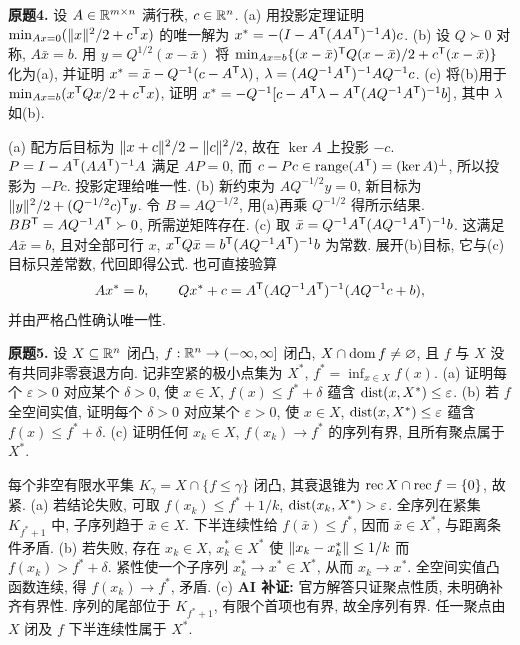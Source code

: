 \begin{exercise}\label{ass:6253-hw2-q4}
\textbf{原题4.} 设 $A\in\mathbb R^{m\times n}$ 满行秩, $c\in\mathbb R^n$.
(a) 用投影定理证明 $\min_{Ax=0}(\lVert x\rVert^2/2+c^{\mathsf T} x)$ 的唯一解为
$x^*=-(I-A^{\mathsf T}(AA^{\mathsf T})^{-1}A)c$.
(b) 设 $Q\succ0$ 对称, $A\bar x=b$. 用 $y=Q^{1/2}(x-\bar x)$ 将
$\min_{Ax=b}\{(x-\bar x)^{\mathsf T} Q(x-\bar x)/2+c^{\mathsf T}(x-\bar x)\}$ 化为(a), 并证明
$x^*=\bar x-Q^{-1}(c-A^{\mathsf T}\lambda)$, $\lambda=(AQ^{-1}A^{\mathsf T})^{-1}AQ^{-1}c$.
(c) 将(b)用于 $\min_{Ax=b}(x^{\mathsf T} Qx/2+c^{\mathsf T} x)$, 证明
$x^*=-Q^{-1}[c-A^{\mathsf T}\lambda-A^{\mathsf T}(AQ^{-1}A^{\mathsf T})^{-1}b]$, 其中 $\lambda$ 如(b).
\end{exercise}
\begin{solution}
(a) 配方后目标为 $\lVert x+c\rVert^2/2-\lVert c\rVert^2/2$, 故在 $\ker A$ 上投影 $-c$. $P=I-A^{\mathsf T}(AA^{\mathsf T})^{-1}A$ 满足 $AP=0$, 而 $c-Pc\in\operatorname{range}(A^{\mathsf T})=(\ker A)^\perp$, 所以投影为 $-Pc$. 投影定理给唯一性.
(b) 新约束为 $AQ^{-1/2}y=0$, 新目标为 $\lVert y\rVert^2/2+(Q^{-1/2}c)^{\mathsf T} y$. 令 $B=AQ^{-1/2}$, 用(a)再乘 $Q^{-1/2}$ 得所示结果. $BB^{\mathsf T}=AQ^{-1}A^{\mathsf T}\succ0$, 所需逆矩阵存在.
(c) 取 $\bar x=Q^{-1}A^{\mathsf T}(AQ^{-1}A^{\mathsf T})^{-1}b$. 这满足 $A\bar x=b$, 且对全部可行 $x$, $x^{\mathsf T} Q\bar x=b^{\mathsf T}(AQ^{-1}A^{\mathsf T})^{-1}b$ 为常数. 展开(b)目标, 它与(c)目标只差常数, 代回即得公式. 也可直接验算
\[
Ax^*=b,\qquad Qx^*+c=A^{\mathsf T}(AQ^{-1}A^{\mathsf T})^{-1}(AQ^{-1}c+b),
\]
并由严格凸性确认唯一性.
\end{solution}

\begin{exercise}\label{ass:6253-hw2-q5}
\textbf{原题5.} 设 $X\subseteq\mathbb R^n$ 闭凸, $f:\mathbb R^n\to(-\infty,\infty]$ 闭凸, $X\cap\operatorname{dom} f\ne\varnothing$, 且 $f$ 与 $X$ 没有共同非零衰退方向. 记非空紧的极小点集为 $X^*$, $f^*=\inf_{x\in X}f(x)$.
(a) 证明每个 $\varepsilon>0$ 对应某个 $\delta>0$, 使 $x\in X$, $f(x)\le f^*+\delta$ 蕴含 $\operatorname{dist}(x,X^*)\le\varepsilon$.
(b) 若 $f$ 全空间实值, 证明每个 $\delta>0$ 对应某个 $\varepsilon>0$, 使 $x\in X$, $\operatorname{dist}(x,X^*)\le\varepsilon$ 蕴含 $f(x)\le f^*+\delta$.
(c) 证明任何 $x_k\in X$, $f(x_k)\to f^*$ 的序列有界, 且所有聚点属于 $X^*$.
\end{exercise}
\begin{solution}
每个非空有限水平集 $K_\gamma=X\cap\{f\le\gamma\}$ 闭凸, 其衰退锥为 $\operatorname{rec} X\cap\operatorname{rec} f=\{0\}$, 故紧.
(a) 若结论失败, 可取 $f(x_k)\le f^*+1/k$, $\operatorname{dist}(x_k,X^*)>\varepsilon$. 全序列在紧集 $K_{f^*+1}$ 中, 子序列趋于 $\bar x\in X$. 下半连续性给 $f(\bar x)\le f^*$, 因而 $\bar x\in X^*$, 与距离条件矛盾.
(b) 若失败, 存在 $x_k\in X$, $x_k^*\in X^*$ 使 $\lVert x_k-x_k^*\rVert\le1/k$ 而 $f(x_k)>f^*+\delta$. 紧性使一个子序列 $x_k^*\to x^*\in X^*$, 从而 $x_k\to x^*$. 全空间实值凸函数连续, 得 $f(x_k)\to f^*$, 矛盾.
(c) \textbf{AI 补证:} 官方解答只证聚点性质, 未明确补齐有界性. 序列的尾部位于 $K_{f^*+1}$, 有限个首项也有界, 故全序列有界. 任一聚点由 $X$ 闭及 $f$ 下半连续性属于 $X^*$.
\end{solution}


